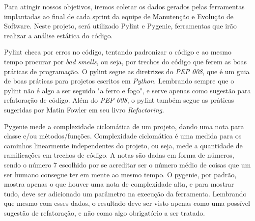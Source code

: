 

Para atingir nossos objetivos, iremos coletar os dados gerados pelas ferramentas
implantadas ao final de cada sprint da equipe de Manutenção e Evolução de Software.
Neste projeto, será utilizado Pylint e Pygenie, ferramentas que irão realizar a
análise estática do código.

Pylint checa por erros no código, tentando padronizar o código e ao mesmo tempo
procurar por \textit{bad smells}, ou seja, por trechos do código que ferem as boas
práticas de programação. O pylint segue as diretrizes do \textit{PEP 008}, que é
um guia de boas práticas para projetos escritos em \textit{Python}. Lembrando sempre
que o pylint não é algo a ser seguido "a ferro e fogo", e serve apenas como sugestão
para refatoração de código. Além do \textit{PEP 008}, o pylint também segue as
práticas sugeridas por Matin Fowler em seu livro \textit{Refactoring}.

Pygenie mede a complexidade ciclomática de um projeto, dando uma nota para classe
e/ou métodos/funções. Complexidade ciclomática é uma medida para os caminhos
linearmente independentes do projeto, ou seja, mede a quantidade de ramificações
em trechos de código. A notas são dadas em forma de números, sendo o número 7
escolhido por se acreditar ser o número médio de coisas que um ser humano consegue
ter em mente ao mesmo tempo. O pygenie, por padrão, mostra apenas o que houver
uma nota de complexidade alta, e para mostrar tudo, deve ser adicionado um parâmetro
na execução da ferramenta. Lembrando que mesmo com esses dados, o resultado deve ser
visto apenas como uma possível sugestão de refatoração, e não como algo obrigatório
a ser tratado.
